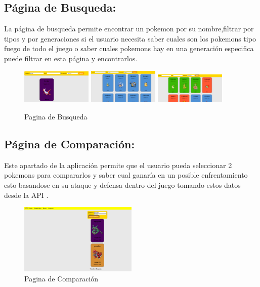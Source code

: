 \documentclass[12pt]{article}
\begin{document}
        \subsection{Página de Busqueda:}
        La página de busqueda permite encontrar un pokemon por su nombre,filtrar por tipos y por generaciones si el usuario necesita saber cuales son los pokemons tipo fuego de todo el juego o saber cuales pokemons hay en una generación especifica puede filtrar en esta página y encontrarlos.
        \begin{figure}[h]
            \centering
            \includegraphics[width=0.3\textwidth]{img/searchpage1.png}
            \includegraphics[width=0.3\textwidth]{img/searchpage2.png}
            \includegraphics[width=0.3\textwidth]{img/searchpage3.png}
            \caption{Pagina de Busqueda}
            \label{figure:searchpage}
        \end{figure}

        \subsection{Página de Comparación:}
        Este apartado de la aplicación permite que el usuario pueda seleccionar 2 pokemons para compararlos y saber cual ganaría en un posible enfrentamiento esto basandose en su ataque y defensa dentro del juego tomando estos datos desde la API .
        \begin{figure}[h]
            \centering
            \includegraphics[width=0.5\textwidth]{img/comparepage.png}
            \caption{Pagina de Comparación}
            \label{figure:comparepage}
        \end{figure}
        \vspace{5cm}
\end{document}

